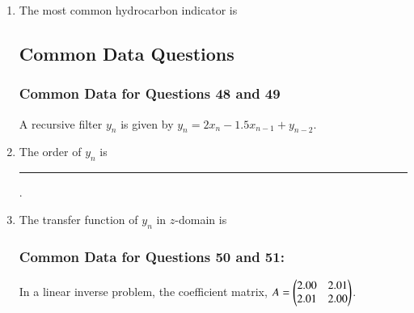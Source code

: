 \documentclass[journal,12pt,onecolumn]{IEEEtran}
\theoremstyle{remark}
\begin{document}
\begin{enumerate}[start = 26 ]
        \item The most common hydrocarbon indicator is \hfill{}
        \begin{enumerate}
        \end{enumerate}
        
            
\subsection*{Common Data Questions}
\subsubsection*{Common Data for Questions 48 and 49}

A recursive filter $y_n$ is given by $y_n = 2x_n - 1.5x_{n-1} + y_{n-2}$.

        \item The order of $y_n$ is \rule{3cm}{0.15mm}. \hfill{}
        
        \item The transfer function of $y_n$ in $z$-domain is \hfill{}
            \begin{enumerate}
            \end{enumerate}

\subsubsection*{Common Data for Questions 50 and 51:}
In a linear inverse problem, the coefficient matrix, $A = \begin{pmatrix} 2.00 & 2.01 \\ 2.01 & 2.00 \end{pmatrix}$.


\end{enumerate}
\end{document}
